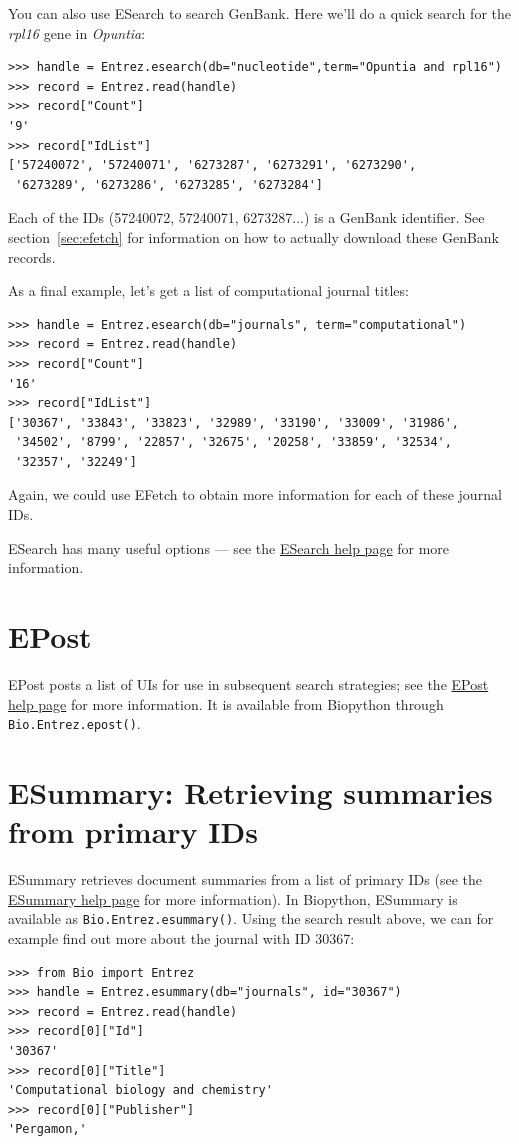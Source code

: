 \documentclass{report}
\begin{document}
You can also use ESearch to search GenBank. Here we'll do a quick search for the \emph{rpl16} gene in \emph{Opuntia}:

\begin{verbatim}
>>> handle = Entrez.esearch(db="nucleotide",term="Opuntia and rpl16")
>>> record = Entrez.read(handle)
>>> record["Count"]
'9'
>>> record["IdList"]
['57240072', '57240071', '6273287', '6273291', '6273290',
 '6273289', '6273286', '6273285', '6273284']
\end{verbatim}

Each of the IDs (57240072, 57240071, 6273287...) is a GenBank identifier. See section~\ref{sec:efetch} for information on how to actually download these GenBank records.

As a final example, let's get a list of computational journal titles:
\begin{verbatim}
>>> handle = Entrez.esearch(db="journals", term="computational")
>>> record = Entrez.read(handle)
>>> record["Count"]
'16'
>>> record["IdList"]
['30367', '33843', '33823', '32989', '33190', '33009', '31986',
 '34502', '8799', '22857', '32675', '20258', '33859', '32534',
 '32357', '32249']
\end{verbatim}
Again, we could use EFetch to obtain more information for each of these journal IDs.

ESearch has many useful options --- see the \href{http://www.ncbi.nlm.nih.gov/entrez/query/static/esearch\_help.html}{ESearch help page} for more information.

\section{EPost}
EPost posts a list of UIs for use in subsequent search strategies; see the  \href{http://www.ncbi.nlm.nih.gov/entrez/query/static/epost\_help.html}{EPost help page} for more information. It is available from Biopython through \verb+Bio.Entrez.epost()+.

\section{ESummary: Retrieving summaries from primary IDs}
ESummary retrieves document summaries from a list of primary IDs (see the  \href{http://www.ncbi.nlm.nih.gov/entrez/query/static/esummary\_help.html}{ESummary help page} for more information). In Biopython, ESummary is available as \verb+Bio.Entrez.esummary()+. Using the search result above, we can for example find out more about the journal with ID 30367:
\begin{verbatim}
>>> from Bio import Entrez
>>> handle = Entrez.esummary(db="journals", id="30367")
>>> record = Entrez.read(handle)
>>> record[0]["Id"]
'30367'
>>> record[0]["Title"]
'Computational biology and chemistry'
>>> record[0]["Publisher"]
'Pergamon,'
\end{verbatim}
\end{document}
